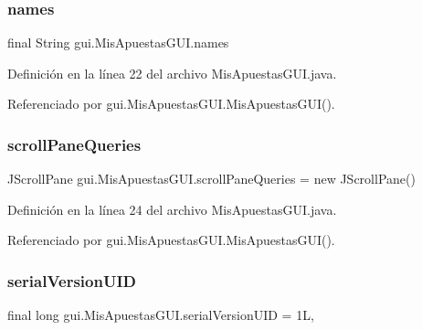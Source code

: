 \subsubsection{\texorpdfstring{names}{names}}
{\footnotesize\ttfamily final String gui.\+Mis\+Apuestas\+G\+U\+I.\+names\hspace{0.3cm}{\ttfamily [private]}}



Definición en la línea 22 del archivo Mis\+Apuestas\+G\+U\+I.\+java.



Referenciado por gui.\+Mis\+Apuestas\+G\+U\+I.\+Mis\+Apuestas\+G\+U\+I().

\mbox{\label{classgui_1_1MisApuestasGUI_a6fd37cfa9f4c3398f088d09b39eb2a6d}} 
\subsubsection{\texorpdfstring{scrollPaneQueries}{scrollPaneQueries}}
{\footnotesize\ttfamily J\+Scroll\+Pane gui.\+Mis\+Apuestas\+G\+U\+I.\+scroll\+Pane\+Queries = new J\+Scroll\+Pane()\hspace{0.3cm}{\ttfamily [private]}}



Definición en la línea 24 del archivo Mis\+Apuestas\+G\+U\+I.\+java.



Referenciado por gui.\+Mis\+Apuestas\+G\+U\+I.\+Mis\+Apuestas\+G\+U\+I().

\mbox{\label{classgui_1_1MisApuestasGUI_ad1dd6ed7b51186ceeb9b75a53a42b4ff}} 
\subsubsection{\texorpdfstring{serialVersionUID}{serialVersionUID}}
{\footnotesize\ttfamily final long gui.\+Mis\+Apuestas\+G\+U\+I.\+serial\+Version\+U\+ID = 1L\hspace{0.3cm}{\ttfamily [static]}, {\ttfamily [private]}}



